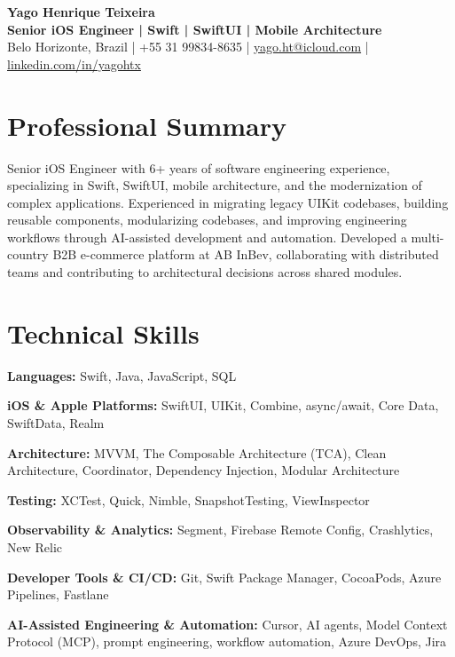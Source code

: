 \documentclass[10pt,a4paper]{article}
\begin{document}
\begin{center}
    {\Large\bfseries Yago Henrique Teixeira}\\[4pt]
    \textbf{Senior iOS Engineer | Swift | SwiftUI | Mobile Architecture}\\[4pt]
    Belo Horizonte, Brazil \quad | \quad +55 31 99834-8635 \quad | \quad
    \href{mailto:yago.ht@icloud.com}{yago.ht@icloud.com}
    \quad | \quad
    \href{https://linkedin.com/in/yagohtx}{linkedin.com/in/yagohtx}
\end{center}


\section{Professional Summary}

Senior iOS Engineer with 6+ years of software engineering experience, specializing in Swift, SwiftUI, mobile architecture, and the modernization of complex applications. Experienced in migrating legacy UIKit codebases, building reusable components, modularizing codebases, and improving engineering workflows through AI-assisted development and automation. Developed a multi-country B2B e-commerce platform at AB InBev, collaborating with distributed teams and contributing to architectural decisions across shared modules.


\section{Technical Skills}

\textbf{Languages:}
Swift, Java, JavaScript, SQL

\textbf{iOS \& Apple Platforms:}
SwiftUI, UIKit, Combine, async/await, Core Data, SwiftData, Realm

\textbf{Architecture:}
MVVM, The Composable Architecture (TCA), Clean Architecture, Coordinator, Dependency Injection, Modular Architecture

\textbf{Testing:}
XCTest, Quick, Nimble, SnapshotTesting, ViewInspector

\textbf{Observability \& Analytics:}
Segment, Firebase Remote Config, Crashlytics, New Relic

\textbf{Developer Tools \& CI/CD:}
Git, Swift Package Manager, CocoaPods, Azure Pipelines, Fastlane

\textbf{AI-Assisted Engineering \& Automation:}
Cursor, AI agents, Model Context Protocol (MCP), prompt engineering, workflow automation, Azure DevOps, Jira
\end{document}
